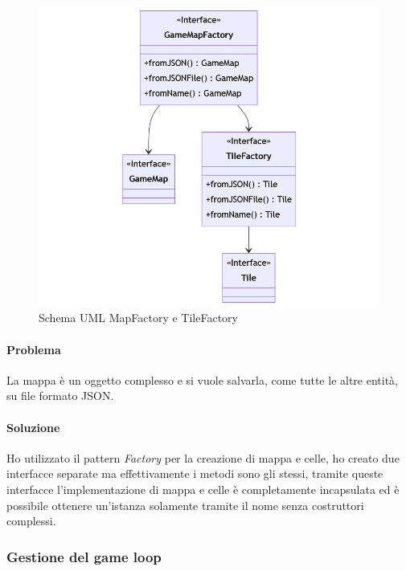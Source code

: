 \documentclass[a4paper,12pt]{report}
\begin{document}
\begin{figure}[H]
	\centering{}
	\includegraphics[width=\textwidth]{MapFactory}
	\caption{Schema UML MapFactory e TileFactory}
	\label{fig:MapFactory}
\end{figure}

\paragraph{Problema} La mappa è un oggetto complesso e si vuole salvarla, come tutte le altre entità, su file formato JSON.
\paragraph{Soluzione} Ho utilizzato il pattern \textit{Factory} per la creazione di mappa e celle, ho creato due interfacce
separate ma effettivamente i metodi sono gli stessi, tramite queste interfacce l'implementazione di mappa e celle è completamente
incapsulata ed è possibile ottenere un'istanza solamente tramite il nome senza costruttori complessi.

\subsubsection{Gestione del game loop}
\end{document}
